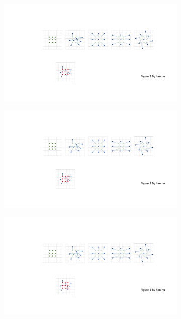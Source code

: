 \documentclass[10pt,twocolumn,letterpaper]{article}
\begin{document}
\begin{figure}[t]
\centering
    \begin{subfigure}{0.24\linewidth}
        \includegraphics[width=\linewidth]{DC_concept_v4a.pdf}
        \caption{}
    \end{subfigure}
    \begin{subfigure}{0.24\linewidth}
        \includegraphics[width=\linewidth]{DC_concept_v4b.pdf}
        \caption{}
    \end{subfigure}
    \begin{subfigure}{0.24\linewidth}
        \includegraphics[width=\linewidth]{DC_concept_v4d.pdf}

\end{subfigure}
\end{figure}
\end{document}

